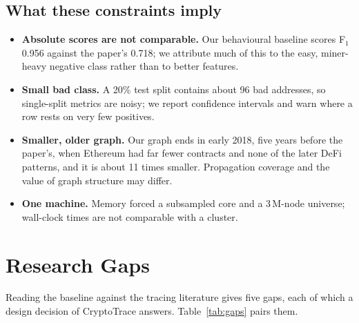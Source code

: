 \subsection{What these constraints imply}
\begin{itemize}
\item \textbf{Absolute scores are not comparable.} Our behavioural baseline scores F$_1$ 0.956 against the paper's 0.718; we attribute much of this to the easy, miner-heavy negative class rather than to better features.
\item \textbf{Small bad class.} A 20\% test split contains about 96 bad addresses, so single-split metrics are noisy; we report confidence intervals and warn where a row rests on very few positives.
\item \textbf{Smaller, older graph.} Our graph ends in early 2018, five years before the paper's, when Ethereum had far fewer contracts and none of the later DeFi patterns, and it is about 11 times smaller. Propagation coverage and the value of graph structure may differ.
\item \textbf{One machine.} Memory forced a subsampled core and a 3\,M-node universe; wall-clock times are not comparable with a cluster.
\end{itemize}

\section{Research Gaps}
\label{sec:gaps}
Reading the baseline against the tracing literature gives five gaps, each of which a design decision of CryptoTrace answers. Table~\ref{tab:gaps} pairs them.


